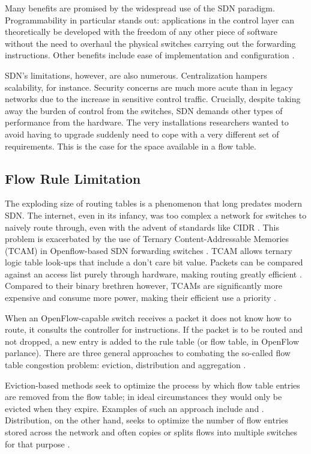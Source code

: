 Many benefits are promised by the widespread use of the SDN paradigm. Programmability in particular stands out: applications in the control layer can theoretically be developed with the freedom of any other piece of software without the need to overhaul the physical switches carrying out the forwarding instructions. Other benefits include ease of implementation and configuration \cite{Benzekki2016}. 

SDN's limitations, however, are also numerous. Centralization hampers scalability, for instance. Security concerns are much more acute than in legacy networks due to the increase in sensitive control traffic. Crucially, despite taking away the burden of control from the switches, SDN demands other types of performance from the hardware. The very installations researchers wanted to avoid having to upgrade suddenly need to cope with a very different set of requirements. This is the case for the space available in a flow table.

\subsection{Flow Rule Limitation}

The exploding size of routing tables is a phenomenon that long predates modern SDN. The internet, even in its infancy, was too complex a network for switches to naively route through, even with the advent of standards like CIDR \cite{TurnerJonathan;BianQiyong;Waldvogel1998}. This problem is exacerbated by the use of Ternary Content-Addressable Memories (TCAM) in Openflow-based SDN forwarding switches \cite{Luo2015}. TCAM allows ternary logic table look-ups that include a don't care bit value. Packets can be compared against an access list purely through hardware, making routing greatly efficient \cite{Hucaby2004}. Compared to their binary brethren however, TCAMs are significantly more expensive and consume more power, making their efficient use a priority \cite{ESiliconCorporation2014}.

When an OpenFlow-capable switch receives a packet it does not know how to route, it consults the controller for instructions. If the packet is to be routed and not dropped, a new entry is added to the rule table (or flow table, in OpenFlow parlance). There are three general approaches to combating the so-called flow table congestion problem: eviction, distribution and aggregation \cite{Leng2017}\cite{Nguyen2016}. 

Eviction-based methods seek to optimize the process by which flow table entries are removed from the flow table; in ideal circumstances they would only be evicted when they expire. Examples of such an approach include \cite{Vishnoi2014} and \cite{Lee2013}. Distribution, on the other hand, seeks to optimize the number of flow entries stored across the network and often copies or splits flows into multiple switches for that purpose \cite{Kanizo2013} \cite{Zhang2014}. 

